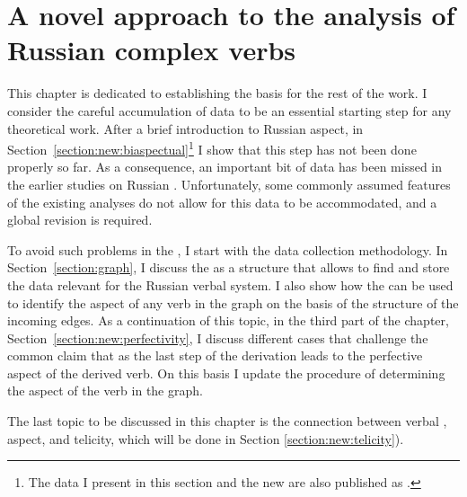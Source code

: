 
\chapter{A novel approach to the analysis of Russian complex verbs} %
\label{Chapter2}
This chapter is dedicated to establishing the basis for the rest of the work. I consider the careful accumulation of data to be an essential starting step for any theoretical work. After a brief introduction to Russian aspect, in Section~\ref{section:new:biaspectual}\footnote{The data I present in this section and the new  are also published as \citealt{ZinovaFilip:13, ZinovaFilip:14b}.} I show that this step has not been done properly so far. As a consequence, an important bit of data has been missed in the earlier studies on Russian . Unfortunately, some commonly assumed features of the existing analyses do not allow for this data to be accommodated, and a global revision is required.
 

To avoid such problems in the , I start with the data collection methodology.
In Section~\ref{section:graph}, I discuss the  as a structure that allows to find and store the data relevant for the Russian verbal  system. I also show how the  can be used to identify the aspect of any verb in the graph on the basis of the structure of the incoming edges. As a continuation of this topic, in the third part of the chapter, Section~\ref{section:new:perfectivity}, I discuss different cases that challenge the common claim that  as the last step of the derivation leads to the perfective aspect of the derived verb. On this basis I update the procedure of determining the aspect of the verb in the graph.  

The last topic to be discussed in this chapter is the connection between verbal , aspect, and telicity, which will be done in Section \ref{section:new:telicity}). 


